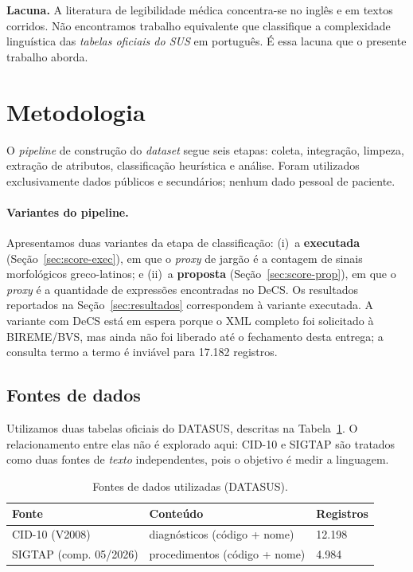 \documentclass[12pt]{article}
\begin{document}
\textbf{Lacuna.} A literatura de legibilidade médica concentra-se no inglês e
em textos corridos. Não encontramos trabalho equivalente que classifique a
complexidade linguística das \textit{tabelas oficiais do SUS} em português.
É essa lacuna que o presente trabalho aborda.

\section{Metodologia}

O \textit{pipeline} de construção do \textit{dataset} segue seis etapas:
coleta, integração, limpeza, extração de atributos, classificação heurística
e análise. Foram utilizados exclusivamente dados públicos e secundários;
nenhum dado pessoal de paciente.

\paragraph{Variantes do pipeline.} Apresentamos duas variantes da etapa de
classificação: (i)~a \textbf{executada} (Seção~\ref{sec:score-exec}), em que
o \textit{proxy} de jargão é a contagem de sinais morfológicos greco-latinos;
e (ii)~a \textbf{proposta} (Seção~\ref{sec:score-prop}), em que o
\textit{proxy} é a quantidade de expressões encontradas no DeCS. Os
resultados reportados na Seção~\ref{sec:resultados} correspondem à variante
executada. A variante com DeCS está em espera porque o XML completo foi
solicitado à BIREME/BVS, mas ainda não foi liberado até o fechamento desta
entrega; a consulta termo a termo é inviável para 17.182 registros.

\subsection{Fontes de dados}

Utilizamos duas tabelas oficiais do DATASUS, descritas na
Tabela~\ref{tab:fontes}. O relacionamento entre elas não é explorado aqui:
CID-10 e SIGTAP são tratados como duas fontes de \textit{texto}
independentes, pois o objetivo é medir a linguagem.

\begin{table}[ht]
\centering
\caption{Fontes de dados utilizadas (DATASUS).}
\label{tab:fontes}
\begin{tabular}{lll}
\toprule
\textbf{Fonte} & \textbf{Conteúdo} & \textbf{Registros} \\
\midrule
CID-10 (V2008)         & diagnósticos (código + nome) & 12.198 \\
SIGTAP (comp. 05/2026) & procedimentos (código + nome) & 4.984 \\
\bottomrule
\end{tabular}
\end{table}
\end{document}
